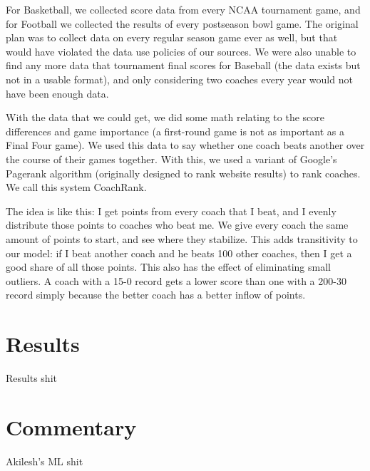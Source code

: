 \documentclass[12pt]{article}
\begin{document}
For Basketball, we collected score data from every NCAA tournament game, and for Football we collected the results of every postseason bowl game. The original plan was to collect data on every regular season game ever as well, but that would have violated the data use policies of our sources. We were also unable to find any more data that tournament final scores for Baseball (the data exists but not in a usable format), and only considering two coaches every year would not have been enough data.

With the data that we could get, we did some math relating to the score differences and game importance (a first-round game is not as important as a Final Four game). We used this data to say whether one coach beats another over the course of their games together. With this, we used a variant of Google's Pagerank algorithm (originally designed to rank website results) to rank coaches. We call this system CoachRank.

The idea is like this: I get points from every coach that I beat, and I evenly distribute those points to coaches who beat me. We give every coach the same amount of points to start, and see where they stabilize. This adds transitivity to our model: if I beat another coach and he beats 100 other coaches, then I get a good share of all those points. This also has the effect of eliminating small outliers. A coach with a 15-0 record gets a lower score than one with a 200-30 record simply because the better coach has a better inflow of points.


\section{Results}
Results shit

\section{Commentary}
Akilesh's ML shit
\end{document}
